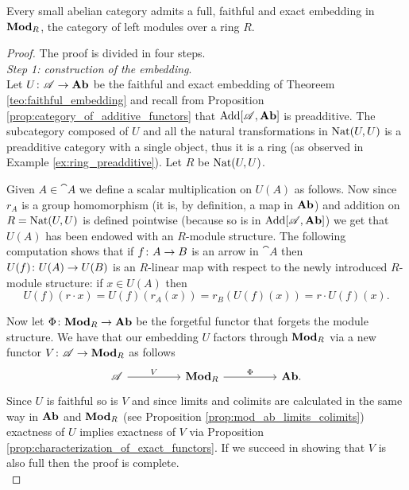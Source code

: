 \begin{theorem}
  \label{teo:mitchell}
  Every small abelian category admits a full, faithful and exact embedding in \(\text{\normalfont\textbf{Mod}}_R\), the category of left modules over a ring \(R\).
\end{theorem}

\begin{proof}
  The proof is divided in four steps.\\

  \noindent\emph{Step 1: construction of the embedding}.\\

  \noindent Let \(U\colon {\mathscr A}\to \text{\normalfont\textbf{Ab}}\) be the faithful and exact embedding of Theoreem \ref{teo:faithful_embedding} and recall from Proposition \ref{prop:category_of_additive_functors} that \(\text{\normalfont Add}[{\mathscr A}, \text{\normalfont\textbf{Ab}}]\) is preadditive. The subcategory composed of \(U\) and all the natural transformations in \(\text{\normalfont Nat}(U,U)\) is a preadditive category with a single object, thus it is a ring (as observed in Example \ref{ex:ring_preadditive}). Let \(R\) be \(\text{\normalfont Nat}(U,U)\).

  Given \(A\in\cat{A}\) we define a scalar multiplication on \(U(A)\) as follows.
  Now since \(r_A\) is a group homomorphism (it is, by definition, a map in \(\text{\normalfont\textbf{Ab}}\)) and addition on \(R = \text{\normalfont Nat}(U,U)\) is defined pointwise (because so is in \(\text{\normalfont Add}[{\mathscr A}, \text{\normalfont\textbf{Ab}}]\)) we get that \(U(A)\) has been endowed with an \(R\)-module structure. The following computation shows that if \(f\colon A\to B\) is an arrow in \(\cat{A}\) then \(U(f)\colon U(A)\to U(B)\) is an \(R\)-linear map with respect to the newly introduced \(R\)-module structure: if \(x\in U(A)\) then
  \begin{equation*}
    U(f)(r\cdot x) = U(f)(r_A(x)) = r_B(U(f)(x)) = r\cdot U(f)(x).
  \end{equation*}

  Now let \(\Phi\colon \text{\normalfont\textbf{Mod}}_R\to \text{\normalfont\textbf{Ab}}\) be the forgetful functor that forgets the module structure. We have that our embedding \(U\) factors through \(\text{\normalfont\textbf{Mod}}_R\) via a new functor \(V\colon {\mathscr A}\to \text{\normalfont\textbf{Mod}}_R\) as follows
  \begin{equation*}
    \begin{tikzcd}[sep=huge]
      \cat{A} \ar[r, "V"] & \catname{Mod}_R \ar[r, "\Phi"] & \catname{Ab}.
    \end{tikzcd}
  \end{equation*}
  Since \(U\) is faithful so is \(V\) and since limits and colimits are calculated in the same way in \(\text{\normalfont\textbf{Ab}}\) and \(\text{\normalfont\textbf{Mod}}_R\) (see Proposition \ref{prop:mod_ab_limits_colimits}) exactness of \(U\) implies exactness of \(V\) via Proposition \ref{prop:characterization_of_exact_functors}. If we succeed in showing that \(V\) is also full then the proof is complete.\\


\end{proof}
